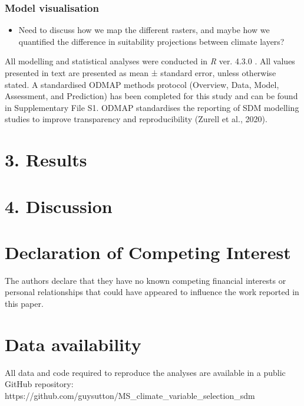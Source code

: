 \documentclass[
  authoryear,
  preprint,
  3p,
  onecolumn]{elsarticle}
\providecommand{\tightlist}{%
  \setlength{\itemsep}{0pt}\setlength{\parskip}{0pt}}\usepackage{longtable,booktabs,array}
\begin{document}
\hypertarget{model-visualisation}{%
\subsubsection{Model visualisation}\label{model-visualisation}}

\begin{itemize}
\tightlist
\item
  Need to discuss how we map the different rasters, and maybe how we
  quantified the difference in suitability projections between climate
  layers?
\end{itemize}

All modelling and statistical analyses were conducted in \emph{R} ver.
4.3.0 \citep{Team2023}. All values presented in text are presented as
mean ± standard error, unless otherwise stated. A standardised ODMAP
methods protocol (Overview, Data, Model, Assessment, and Prediction) has
been completed for this study and can be found in Supplementary File S1.
ODMAP standardises the reporting of SDM modelling studies to improve
transparency and reproducibility (Zurell et al., 2020).

\hypertarget{results}{%
\section{3. Results}\label{results}}

\hypertarget{discussion}{%
\section{4. Discussion}\label{discussion}}

\hypertarget{declaration-of-competing-interest}{%
\section{Declaration of Competing
Interest}\label{declaration-of-competing-interest}}

The authors declare that they have no known competing financial
interests or personal relationships that could have appeared to
influence the work reported in this paper.

\hypertarget{data-availability}{%
\section{Data availability}\label{data-availability}}

All data and code required to reproduce the analyses are available in a
public GitHub repository:
https://github.com/guysutton/MS\_climate\_variable\_selection\_sdm
\end{document}
